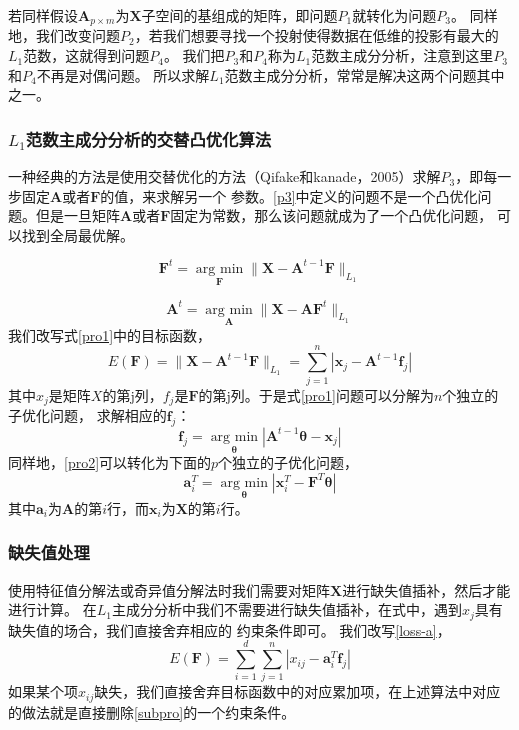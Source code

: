 若同样假设$\bm{A}_{p\times m}$为$\bm{X}$子空间的基组成的矩阵，即问题$P_1$就转化为问题$P_3$。
同样地，我们改变问题$P_2$，若我们想要寻找一个投射使得数据在低维的投影有最大的$L_1$范数，这就得到问题$P_4$。
我们把$P_3$和$P_4$称为$L_1$范数主成分分析，注意到这里$P_3$和$P_4$不再是对偶问题。
所以求解$L_1$范数主成分分析，常常是解决这两个问题其中之一。

\subsubsection{$L_1$范数主成分分析的交替凸优化算法}

一种经典的方法是使用交替优化的方法（Qifake和kanade，2005）求解$P_3$，即每一步固定$\bm{A}$或者$\bm{F}$的值，来求解另一个
参数。\eqref{p3}中定义的问题不是一个凸优化问题。但是一旦矩阵$\bm{A}$或者$\bm{F}$固定为常数，那么该问题就成为了一个凸优化问题，
可以找到全局最优解。

\begin{equation}\label{pro1}
\bm F^{t} = \underset{\bm F}{\operatorname{arg\ min}} \|\bm{X} - \bm{A}^{t-1}\bm{F} \|_{L_1} 
\end{equation}

\begin{equation}\label{pro2}
\bm{A}^{t} = \underset{\bm{A}}{\operatorname{arg\ min}} \|\bm X - \bm{A}\bm F^{t}\|_{L_1} 
\end{equation}
我们改写式\eqref{pro1}中的目标函数，
\begin{equation}\label{loss-a}
E(\bm{F}) = \|\bm{X} - \bm{A}^{t-1}\bm{F} \|_{L_1} = \sum_{j=1}^{n}|\bm{x}_j - \bm{A}^{t-1}\bm{f}_j| 
\end{equation}
其中$x_j$是矩阵$X$的第j列，$f_j$是$\bm{F}$的第j列。于是式\eqref{pro1}问题可以分解为$n$个独立的子优化问题，
求解相应的$\bm{f}_j$：
\begin{equation}\label{subpro}
    \bm{f}_j = \underset{\bm{\theta}}{\operatorname{arg\ min}} |\bm{A}^{t-1}\bm{\theta} - \bm{x}_j|
\end{equation}
同样地，\eqref{pro2}可以转化为下面的$p$个独立的子优化问题，
\begin{equation}\label{subproabs}
    \bm{a}_i^T = \underset{\bm{\theta}}{\operatorname{arg\ min}} |\bm{x}_i^T - \bm{F}^T\bm{\theta}|
\end{equation}
其中$\bm{a}_i$为$\bm{A}$的第$i$行，而$\bm{x}_i$为$\bm{X}$的第$i$行。

\subsubsection{缺失值处理}
使用特征值分解法或奇异值分解法时我们需要对矩阵$\bm{X}$进行缺失值插补，然后才能进行计算。
在$L_1$主成分分析中我们不需要进行缺失值插补，在式中，遇到$x_j$具有缺失值的场合，我们直接舍弃相应的
约束条件即可。
我们改写\eqref{loss-a}，
$$E(\bm F) = \sum_{i=1}^d \sum_{j=1}^n |x_{ij} - \bm a_i^T\bm f_j|$$
如果某个项$x_{ij}$缺失，我们直接舍弃目标函数中的对应累加项，在上述算法中对应的做法就是直接删除\eqref{subpro}的一个约束条件。

